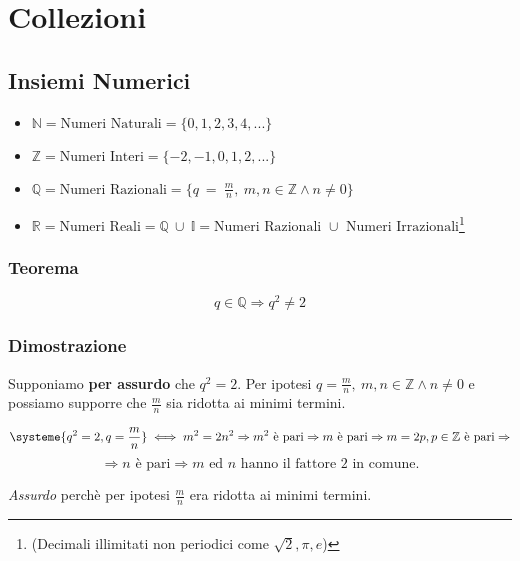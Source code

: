 \section{Collezioni}
\subsection{Insiemi Numerici}
    \begin{itemize}
        \item $\mathbb{N} = \text{Numeri Naturali} = \{0,1,2,3,4,...\}$
        \item $\mathbb{Z} = \text{Numeri Interi} = \{-2,-1,0,1,2,...\}$
        \item $\mathbb{Q} = \text{Numeri Razionali} = \{q\ =\ \frac{m}{n},\ m,n \in \mathbb{Z} \land n \neq 0\}$
        \item $\mathbb{R} = \text{Numeri Reali} = \mathbb{Q}\ \cup\ \mathbb{I} = \text{Numeri Razionali } \cup \text{ Numeri Irrazionali}$\footnote{(Decimali illimitati non periodici come $\sqrt{2}, \pi, e$)}\newline 
    \end{itemize}
    \subsubsection*{Teorema}
    \begin{Large}
        \begin{equation*}
            q \in \mathbb{Q} \Rightarrow q^2 \neq 2
        \end{equation*}
    \end{Large}
    \subsubsection*{Dimostrazione}
        Supponiamo \textbf{per assurdo} che $q^2 = 2$.
        Per ipotesi $q = \frac{m}{n},\ m,n \in \mathbb{Z} \land n \neq 0$ e possiamo supporre che
        $\frac{m}{n}$ sia ridotta ai minimi termini.
        \begin{Large}
            \[
                \systeme{q^2=2,q=\frac{m}{n}} 
                    \iff m^2 = 2n^2
                    \Rightarrow m^2\ \text{è pari} \Rightarrow m\ \text{è pari}
                    \Rightarrow m = 2p, p \in \mathbb{Z} \text{ è pari}\Rightarrow\]
            \[
                \Rightarrow n \text{ è pari}\Rightarrow m \text{ ed } n \text{ hanno il fattore } 2 \text{ in comune}.
            \]\newline
        \end{Large}
        \textit{Assurdo} perchè per ipotesi $\frac{m}{n}$ era ridotta ai minimi termini.
